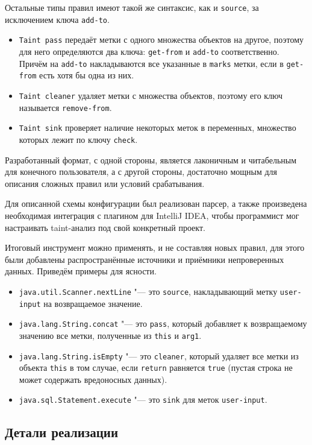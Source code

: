 Остальные типы правил имеют такой же синтаксис, как и \verb|source|, за исключением ключа \verb|add-to|.

\begin{itemize}
    \item \verb|Taint pass| передаёт метки с одного множества объектов на другое, поэтому для него определяются два ключа: \verb|get-from| и \verb|add-to| соответственно. Причём на \verb|add-to| накладываются все указанные в \verb|marks| метки, если в \verb|get-from| есть хотя бы одна из них.
    \item \verb|Taint cleaner| удаляет метки с множества объектов, поэтому его ключ называется \verb|remove-from|.
    \item \verb|Taint sink| проверяет наличие некоторых меток в переменных, множество которых лежит по ключу \verb|check|.
\end{itemize}

Разработанный формат, с одной стороны, является лаконичным и читабельным для конечного пользователя, а с другой стороны, достаточно мощным для описания сложных правил или условий срабатывания.

Для описанной схемы конфигурации был реализован парсер, а также произведена необходимая интеграция с плагином для IntelliJ IDEA, чтобы программист мог настраивать taint-анализ под свой конкретный проект. 

Итоговый инструмент можно применять, и не составляя новых правил, для этого были добавлены распространённые источники и приёмники непроверенных данных. Приведём примеры для ясности. 

\begin{itemize}
    \item \verb|java.util.Scanner.nextLine| "--- это \verb|source|, накладывающий метку \verb|user-input| на возвращаемое значение.
    \item \verb|java.lang.String.concat| "--- это \verb|pass|, который добавляет к возвращаемому значению все метки, полученные из \verb|this| и \verb|arg1|.
    \item \verb|java.lang.String.isEmpty| "--- это \verb|cleaner|, который удаляет все метки из объекта \verb|this| в том случае, если \verb|return| равняется \verb|true| (пустая строка не может содержать вредоносных данных).
    \item \verb|java.sql.Statement.execute| "--- это \verb|sink| для меток \verb|user-input|.
\end{itemize}

\subsection{Детали реализации}

